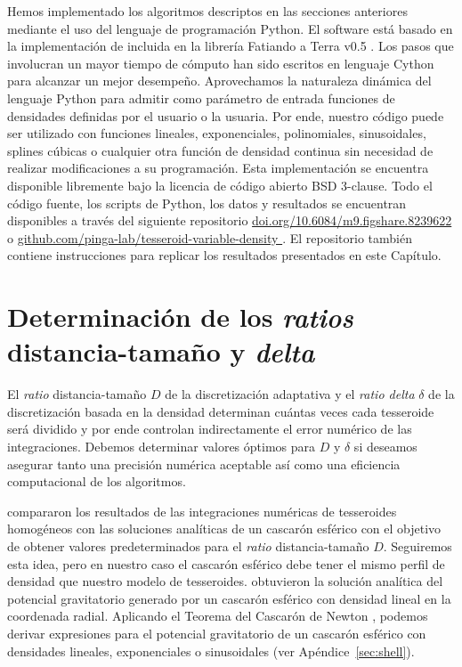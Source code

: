 Hemos implementado los algoritmos descriptos en las secciones anteriores
mediante el uso del lenguaje de programación Python.
El software está basado en la implementación de \citet{uieda2016} incluida en
la librería Fatiando a Terra v0.5 \citep{uieda2013}.
Los pasos que involucran un mayor tiempo de cómputo han sido escritos en
lenguaje Cython para alcanzar un mejor desempeño.
Aprovechamos la naturaleza dinámica del lenguaje Python para admitir como
parámetro de entrada funciones de densidades definidas por el usuario o la
usuaria.
Por ende, nuestro código puede ser utilizado con funciones lineales,
exponenciales, polinomiales, sinusoidales, splines cúbicas o cualquier otra
función de densidad continua sin necesidad de realizar modificaciones a su
programación.
Esta implementación se encuentra disponible libremente bajo la licencia
de código abierto BSD 3-clause.
Todo el código fuente, los scripts de Python, los datos y resultados se
encuentran disponibles a través del siguiente repositorio
\href{
    https://doi.org/10.6084/m9.figshare.8239622
}{
    doi.org/10.6084/m9.figshare.8239622
}
\citep{soler2019b} o
\href{
    https://github.com/pinga-lab/tesseroid-variable-density
}{
    github.com/pinga-lab/tesseroid-variable-density
}.
El repositorio también contiene instrucciones para replicar los resultados
presentados en este Capítulo.



\section{Determinación de los \emph{ratios} distancia-tamaño y \emph{delta}}

El \emph{ratio} distancia-tamaño $D$ de la discretización adaptativa y el
\emph{ratio delta} $\delta$ de la discretización basada en la densidad
determinan cuántas veces cada tesseroide será dividido y por ende controlan
indirectamente el error numérico de las integraciones.
Debemos determinar valores óptimos para $D$ y $\delta$ si deseamos asegurar
tanto una precisión numérica aceptable así como una eficiencia computacional de
los algoritmos.

\citet{uieda2016} compararon los resultados de las integraciones numéricas de
tesseroides homogéneos con las soluciones analíticas de un cascarón esférico
\citep{mikuska2006, grombein2013} con el objetivo de obtener valores
predeterminados para el \emph{ratio} distancia-tamaño $D$.
Seguiremos esta idea, pero en nuestro caso el cascarón esférico debe tener el
mismo perfil de densidad que nuestro modelo de tesseroides. \citet{lin2019}
obtuvieron la solución analítica del potencial gravitatorio generado por un
cascarón esférico con densidad lineal en la coordenada radial.
Aplicando el Teorema del Cascarón de Newton \citep{chandrasekhar1995,
binney2008}, podemos derivar expresiones para el potencial gravitatorio de un
cascarón esférico con densidades lineales, exponenciales o sinusoidales (ver
Apéndice~\ref{sec:shell}).

